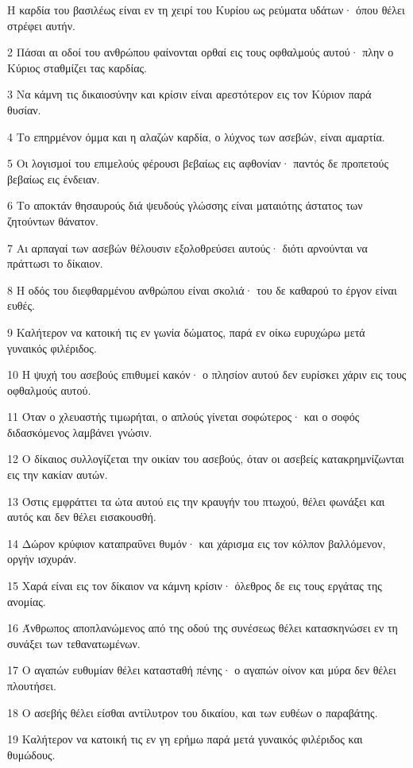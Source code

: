 \par Η καρδία του βασιλέως είναι εν τη χειρί του Κυρίου ως ρεύματα υδάτων· όπου θέλει στρέφει αυτήν.
\par 2 Πάσαι αι οδοί του ανθρώπου φαίνονται ορθαί εις τους οφθαλμούς αυτού· πλην ο Κύριος σταθμίζει τας καρδίας.
\par 3 Να κάμνη τις δικαιοσύνην και κρίσιν είναι αρεστότερον εις τον Κύριον παρά θυσίαν.
\par 4 Το επηρμένον όμμα και η αλαζών καρδία, ο λύχνος των ασεβών, είναι αμαρτία.
\par 5 Οι λογισμοί του επιμελούς φέρουσι βεβαίως εις αφθονίαν· παντός δε προπετούς βεβαίως εις ένδειαν.
\par 6 Το αποκτάν θησαυρούς διά ψευδούς γλώσσης είναι ματαιότης άστατος των ζητούντων θάνατον.
\par 7 Αι αρπαγαί των ασεβών θέλουσιν εξολοθρεύσει αυτούς· διότι αρνούνται να πράττωσι το δίκαιον.
\par 8 Η οδός του διεφθαρμένου ανθρώπου είναι σκολιά· του δε καθαρού το έργον είναι ευθές.
\par 9 Καλήτερον να κατοική τις εν γωνία δώματος, παρά εν οίκω ευρυχώρω μετά γυναικός φιλέριδος.
\par 10 Η ψυχή του ασεβούς επιθυμεί κακόν· ο πλησίον αυτού δεν ευρίσκει χάριν εις τους οφθαλμούς αυτού.
\par 11 Όταν ο χλευαστής τιμωρήται, ο απλούς γίνεται σοφώτερος· και ο σοφός διδασκόμενος λαμβάνει γνώσιν.
\par 12 Ο δίκαιος συλλογίζεται την οικίαν του ασεβούς, όταν οι ασεβείς κατακρημνίζωνται εις την κακίαν αυτών.
\par 13 Όστις εμφράττει τα ώτα αυτού εις την κραυγήν του πτωχού, θέλει φωνάξει και αυτός και δεν θέλει εισακουσθή.
\par 14 Δώρον κρύφιον καταπραΰνει θυμόν· και χάρισμα εις τον κόλπον βαλλόμενον, οργήν ισχυράν.
\par 15 Χαρά είναι εις τον δίκαιον να κάμνη κρίσιν· όλεθρος δε εις τους εργάτας της ανομίας.
\par 16 Άνθρωπος αποπλανώμενος από της οδού της συνέσεως θέλει κατασκηνώσει εν τη συνάξει των τεθανατωμένων.
\par 17 Ο αγαπών ευθυμίαν θέλει κατασταθή πένης· ο αγαπών οίνον και μύρα δεν θέλει πλουτήσει.
\par 18 Ο ασεβής θέλει είσθαι αντίλυτρον του δικαίου, και των ευθέων ο παραβάτης.
\par 19 Καλήτερον να κατοική τις εν γη ερήμω παρά μετά γυναικός φιλέριδος και θυμώδους.

